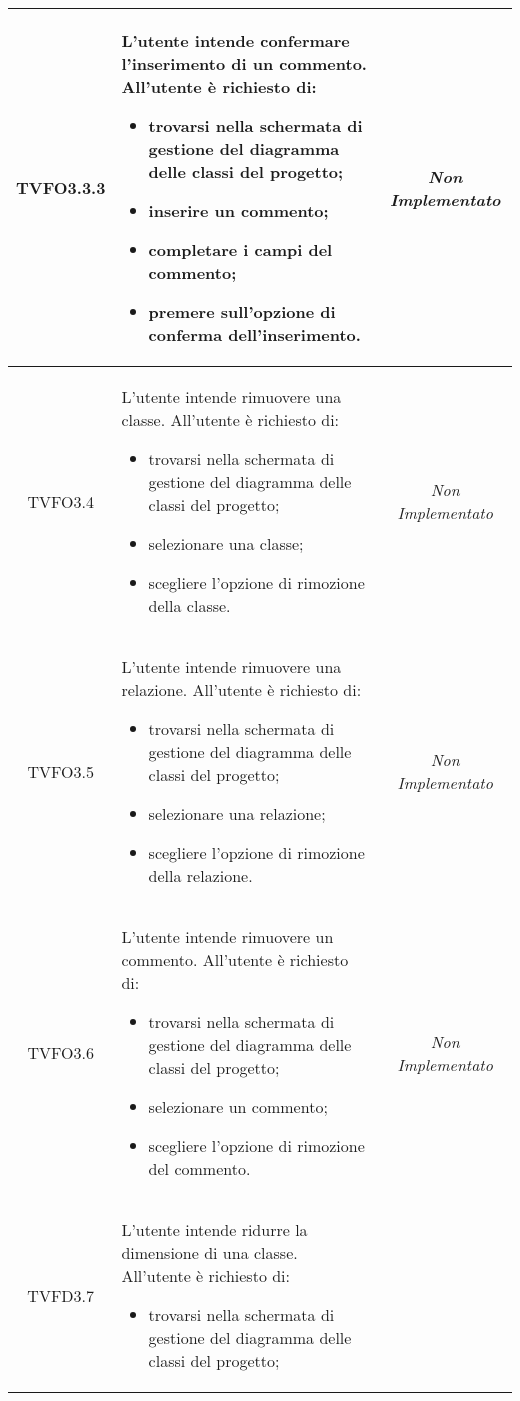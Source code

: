 \begin{longtable}{|c|>{}m{8cm}|c|}
\hypertarget{TVFO3.3.3}{TVFO3.3.3} & L'utente intende confermare l'inserimento di un commento. 
All'utente è richiesto di: 
\begin{itemize} 
\item trovarsi nella schermata di gestione del diagramma delle classi del progetto;
\item inserire un commento;
\item completare i campi del commento;
\item premere sull'opzione di conferma dell'inserimento. 
\end{itemize} & \textit{Non Implementato}\\ \hline
\hypertarget{TVFO3.4}{TVFO3.4} & L'utente intende rimuovere una classe.
All'utente è richiesto di:
\begin{itemize}
\item trovarsi nella schermata di gestione del diagramma delle classi del progetto;
\item selezionare una classe;
\item scegliere l'opzione di rimozione della classe.
\end{itemize} & \textit{Non Implementato}\\ \hline
\hypertarget{TVFO3.5}{TVFO3.5} & L'utente intende rimuovere una relazione.
All'utente è richiesto di:
\begin{itemize}
\item trovarsi nella schermata di gestione del diagramma delle classi del progetto;
\item selezionare una relazione; 
\item scegliere l'opzione di rimozione della relazione.
\end{itemize} & \textit{Non Implementato}\\ \hline
\hypertarget{TVFO3.6}{TVFO3.6} & L'utente intende rimuovere un commento.
All'utente è richiesto di:
\begin{itemize}
\item trovarsi nella schermata di gestione del diagramma delle classi del progetto;
\item selezionare un commento;
\item scegliere l'opzione di rimozione del commento.
\end{itemize} & \textit{Non Implementato}\\ \hline
\hypertarget{TVFD3.7}{TVFD3.7} & L'utente intende ridurre la dimensione di una classe.
All'utente è richiesto di:
\begin{itemize}
\item trovarsi nella schermata di gestione del diagramma delle classi del progetto;

\end{itemize}
\end{longtable}
